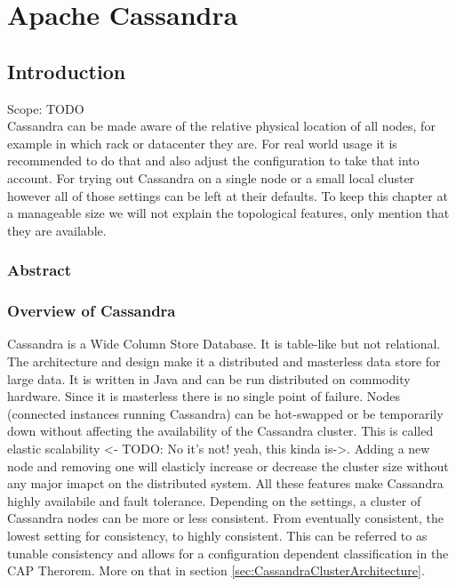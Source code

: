 \chapter{Apache Cassandra}

\section{Introduction}
Scope: TODO \\
Cassandra can be made aware of the relative physical location of all nodes, for example in which rack or datacenter they are. For real world usage it is recommended to do that and also adjust the configuration to take that into account. For trying out Cassandra on a single node or a small local cluster however all of those settings can be left at their defaults. To keep this chapter at a manageable size we will not explain the topological features, only mention that they are available.

\subsection{Abstract}
\subsection{Overview of Cassandra}
Cassandra is a Wide Column Store Database. It is table-like but not relational. The architecture and design make it a distributed and masterless data store for large data. It is written in Java and can be run distributed on commodity hardware.
Since it is masterless there is no single point of failure. Nodes (connected instances running Cassandra) can be hot-swapped or be temporarily down without affecting the availability of the Cassandra cluster.
This is called elastic scalability <- TODO: No it's not! yeah, this kinda is->. Adding a new node and removing one will elasticly increase or decrease the cluster size without any major imapct on the distributed system.
All these features make Cassandra highly availabile and fault tolerance. Depending on the settings, a cluster of Cassandra nodes can be more or less consistent. From eventually consistent, the lowest setting for consistency, to highly consistent.
This can be referred to as tunable consistency and allows for a configuration dependent classification in the CAP Therorem. More on that in section \ref{sec:CassandraClusterArchitecture}.

